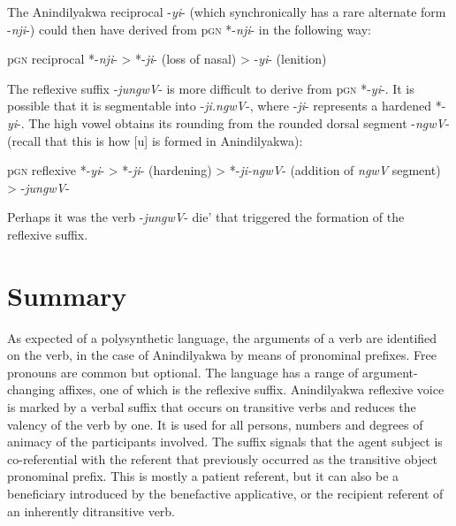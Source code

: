 \documentclass[output=paper]{langscibook}
\begin{document}
The Anindilyakwa reciprocal -\textit{yi}- (which synchronically has a rare alternate form -\textit{nji}-) could then have derived from p\textsc{gn} *-\textit{nji}- in the following way:

\ea 
p\textsc{gn} reciprocal *-\textit{nji}- > *-\textit{ji}- (loss of nasal) > -\textit{yi}- (lenition)
\z

The reflexive suffix -\textit{jungwV}- is more difficult to derive from p\textsc{gn} *-\textit{yi}-. It is possible that it is segmentable into -\textit{ji.ngwV}-, where -\textit{ji}- represents a hardened *-\textit{yi}-. The high vowel obtains its rounding from the rounded dorsal segment -\textit{ngwV}- (recall that this is how [u] is formed in Anindilyakwa):

\ea
p\textsc{gn} reflexive *-\textit{yi}- > *-\textit{ji}- (hardening) > *-\textit{ji-ngwV}- (addition of \textit{ngwV} segment) > -\textit{jungwV}-
\z 

Perhaps it was the verb -\textit{jungwV}- die’ that triggered the formation of the reflexive suffix.

\section{Summary}
\label{sec:vanegmond:5}

As expected of a polysynthetic language, the arguments of a verb are identified on the verb, in the case of Anindilyakwa by means of pronominal prefixes. Free pronouns are common but optional. The language has a range of argument-changing affixes, one of which is the reflexive suffix. Anindilyakwa reflexive voice is marked by a verbal suffix that occurs on transitive verbs and reduces the valency of the verb by one. It is used for all persons, numbers and degrees of animacy of the participants involved. The suffix signals that the agent subject is co-referential with the referent that previously occurred as the transitive object pronominal prefix. This is mostly a patient referent, but it can also be a beneficiary introduced by the benefactive applicative, or the recipient referent of an inherently ditransitive verb.
\end{document}
